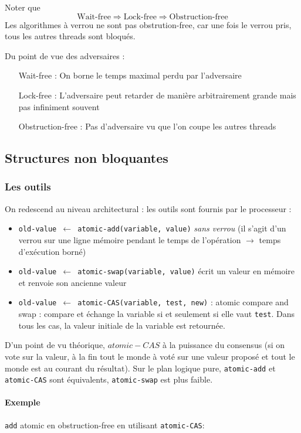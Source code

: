 \documentclass{article}
\begin{document}
Noter que
\[\text{Wait-free} \Rightarrow \text{Lock-free} \Rightarrow \text{Obstruction-free}\]
Les algorithmes à verrou ne sont pas obstrution-free, car une fois le verrou pris, tous les autres threads sont bloqués.
\bigskip

Du point de vue des adversaires :
\begin{itemize}
\item[Wait-free :] On borne le temps maximal perdu par l'adversaire
\item[Lock-free :] L'adversaire peut retarder de manière arbitrairement grande mais pas infiniment souvent
\item[Obstruction-free :] Pas d'adversaire vu que l'on coupe les autres threads
\end{itemize}

\subsection{Structures non bloquantes}
\subsubsection{Les outils}
On redescend au niveau architectural : les outils sont fournis par le processeur :
\begin{itemize}
\item \texttt{old-value $\leftarrow$ atomic-add(variable, value)} \emph{sans verrou} (il s'agit d'un verrou sur une ligne mémoire pendant le temps de l'opération $\to$ temps d'exécution borné)
\item \texttt{old-value $\leftarrow$ atomic-swap(variable, value)} écrit un valeur en mémoire et renvoie son ancienne valeur
\item \texttt{old-value $\leftarrow$ atomic-CAS(variable, test, new)} : atomic compare and swap : compare et échange la variable si et seulement si elle vaut \texttt{test}. Dans tous les cas, la valeur initiale de la variable est retournée.
\end{itemize}

D'un point de vu théorique, $atomic-CAS$ à la puissance du consensus (si on vote sur la valeur, à la fin tout le monde à voté sur une valeur proposé et tout le monde est au courant du résultat). Sur le plan logique pure, \texttt{atomic-add} et \texttt{atomic-CAS} sont équivalents, \texttt{atomic-swap} est plus faible.

\paragraph{Exemple} \texttt{add} atomic en obstruction-free en utilisant \texttt{atomic-CAS}:\\
\begin{algorithm}[H]
\end{algorithm}
\bigskip
\end{document}
